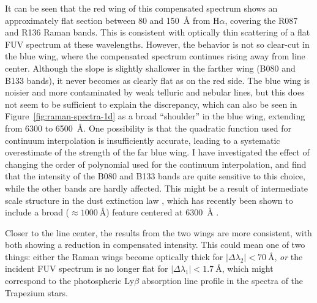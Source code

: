 \documentclass[useAMS, usenatbib, a4paper]{mnras}
\newcommand\ha{\ensuremath{\text{H}\alpha}}
\newcommand\lyb{\ensuremath{\text{Ly}\beta}}
\begin{document}
It can be seen that the red wing of this compensated spectrum
shows an approximately flat section
between \num{+80} and \SI{+150}{\angstrom} from \ha{},
covering the R087 and R136 Raman bands.
This is consistent with optically thin scattering of a flat FUV spectrum at these wavelengths.
However, the behavior is not so clear-cut in the blue wing,
where the compensated spectrum continues rising away from line center.
Although the slope is slightly shallower in the farther wing (B080 and B133 bands),
it never becomes as clearly flat as on the red side. 
The blue wing is noisier and more contaminated
by weak telluric and nebular lines, but this does not seem to be sufficient
to explain the discrepancy,
which can also be seen in Figure~\ref{fig:raman-spectra-1d} as a broad ``shoulder''
in the blue wing, extending from \num{6300} to \SI{6500}{\angstrom}.
One possibility is that the quadratic function used for continuum interpolation
is insufficiently accurate,
leading to a systematic overestimate of the strength of the far blue wing.
I have investigated the effect of changing the order of polynomial
used for the continuum interpolation,
and find that the intensity of the B080 and B133 bands are quite sensitive to this choice,
while the other bands are hardly affected.
This might be a result of intermediate scale structure
in the dust extinction law \citep{Whiteoak:1966a},
which has recently been shown to include a broad (\(\approx \SI{1000}{\angstrom}\))
feature centered at \SI{6300}{\angstrom} \citep{Massa:2020a}.

Closer to the line center, the results from the two wings are more consistent,
with both showing a reduction in compensated intensity.
This could mean one of two things: either the Raman wings become optically thick
for \(\vert \Delta\lambda_2 \vert < \SI{70}{\angstrom}\),
\emph{or} the incident FUV spectrum is no longer flat for \(\vert \Delta\lambda_1 \vert < \SI{1.7}{\angstrom}\),
which might correspond to the photospheric \lyb{} absorption line profile
in the spectra of the Trapezium stars.
\end{document}

